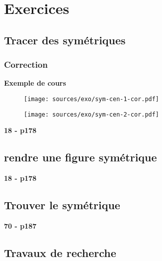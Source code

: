 \documentclass[11pt]{article}
\begin{document}
\section{Exercices}

\subsection{Tracer des symétriques}

\subsubsection{Correction}

\textbf{Exemple de cours}

\begin{figure}[H]
  \centering
  \texttt{[image: sources/exo/sym-cen-1-cor.pdf]}
  \label{fig:exo2}
\end{figure}

\begin{figure}[H]
  \centering
  \texttt{[image: sources/exo/sym-cen-2-cor.pdf]}
  \label{fig:exo2}
\end{figure}


\textbf{18 - p178}\\

\subsection{rendre une figure symétrique}

\textbf{18 - p178}\\

\subsection{Trouver le symétrique}

\textbf{70 - p187}\\

\subsection{Travaux de recherche}
\end{document}
